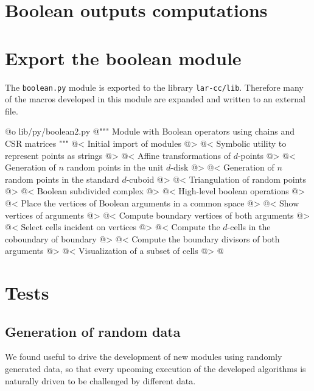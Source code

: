 \documentclass[11pt,oneside]{article}	%
\begin{document}
\section{Boolean outputs computations}
\section{Export the boolean module}

The \texttt{boolean.py} module is exported to the library \texttt{lar-cc/lib}. Therefore many of the macros developed in this module are expanded and written to an external file.

@o lib/py/boolean2.py
@{""" Module with Boolean operators using chains and CSR matrices """
@< Initial import of modules @>
@< Symbolic utility to represent points as strings @>
@< Affine transformations of $d$-points @>
@< Generation of $n$ random points in the unit $d$-disk @>
@< Generation of $n$ random points in the standard $d$-cuboid @>
@< Triangulation of random points @>
@< Boolean subdivided complex @>
@< High-level boolean operations @>
@< Place the vertices of Boolean arguments in a common space @>
@< Show vertices of arguments @>
@< Compute boundary vertices of both arguments @>
@< Select cells incident on vertices @>
@< Compute the $d$-cells in the coboundary of boundary @>
@< Compute the boundary divisors of both arguments @>
@< Visualization of a subset of cells @>
@}

\section{Tests}
\subsection{Generation of random data}

We found useful to drive the development of new modules using randomly generated data, so that every upcoming execution of the developed algorithms is naturally driven to be challenged by different data.
\end{document}

